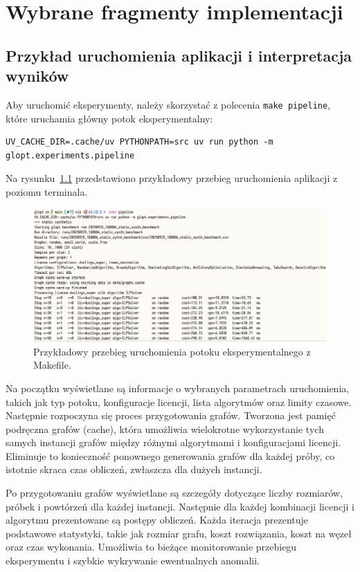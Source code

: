 \chapter{Wybrane fragmenty implementacji}

\section{Przykład uruchomienia aplikacji i interpretacja wyników}

Aby uruchomić eksperymenty, należy skorzystać z polecenia \texttt{make pipeline}, które uruchamia główny potok eksperymentalny:
\begin{verbatim}
UV_CACHE_DIR=.cache/uv PYTHONPATH=src uv run python -m glopt.experiments.pipeline
\end{verbatim}

Na rysunku~\ref{fig:cli-content} przedstawiono przykładowy przebieg uruchomienia aplikacji z poziomu terminala.

\begin{figure}[H]
    \centering
    \includegraphics[width=0.95\linewidth]{assets/cli-content.png}
    \caption{Przykładowy przebieg uruchomienia potoku eksperymentalnego z Makefile.}
    \label{fig:cli-content}
\end{figure}

Na początku wyświetlane są informacje o wybranych parametrach uruchomienia, takich jak typ potoku, konfiguracje licencji, lista algorytmów oraz limity czasowe. Następnie rozpoczyna się proces przygotowania grafów. Tworzona jest pamięć podręczna grafów (cache), która umożliwia wielokrotne wykorzystanie tych samych instancji grafów między różnymi algorytmami i konfiguracjami licencji. Eliminuje to konieczność ponownego generowania grafów dla każdej próby, co istotnie skraca czas obliczeń, zwłaszcza dla dużych instancji.

Po przygotowaniu grafów wyświetlane są szczegóły dotyczące liczby rozmiarów, próbek i powtórzeń dla każdej instancji. Następnie dla każdej kombinacji licencji i algorytmu prezentowane są postępy obliczeń. Każda iteracja prezentuje podstawowe statystyki, takie jak rozmiar grafu, koszt rozwiązania, koszt na węzeł oraz czas wykonania. Umożliwia to bieżące monitorowanie przebiegu eksperymentu i szybkie wykrywanie ewentualnych anomalii.

